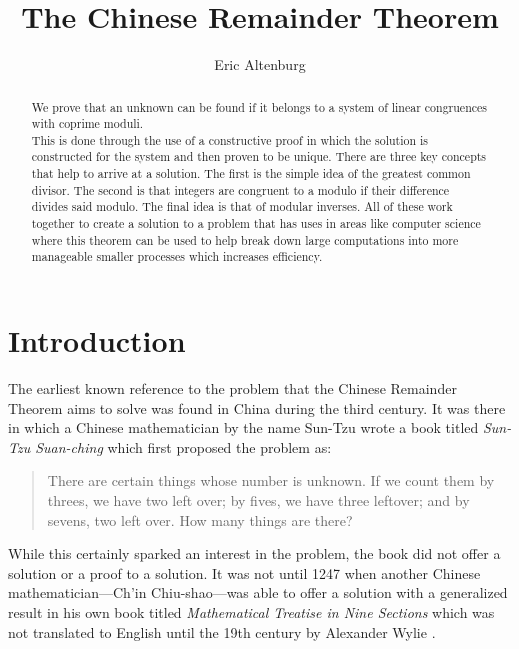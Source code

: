 \documentclass[12pt,a4paper,reqno,parskip=full]{amsart}
\numberwithin{equation}{section}
\theoremstyle{plain}
\theoremstyle{definition}
\begin{document}
\title{The Chinese Remainder Theorem}

\author{Eric Altenburg}

\begin{abstract}
We prove that an unknown can be found if it belongs to a system of linear congruences with coprime moduli.\\

This is done through the use of a constructive proof in which the solution is constructed for the system and then proven to be unique. There are three key concepts that help to arrive at a solution. The first is the simple idea of the greatest common divisor. The second is that integers are congruent to a modulo if their difference divides said modulo. The final idea is that of modular inverses. All of these work together to create a solution to a problem that has uses in areas like computer science where this theorem can be used to help break down large computations into more manageable smaller processes which increases efficiency.
\end{abstract}

\maketitle



\section{Introduction}

The earliest known reference to the problem that the Chinese Remainder Theorem aims to solve was found in China during the third century. It was there in which a Chinese mathematician by the name Sun-Tzu wrote a book titled \textit{Sun-Tzu Suan-ching} which first proposed the problem as:

\begin{quote}
	There are certain things whose number is unknown. If we count them by threes, we have two left over; by fives, we have three leftover; and by sevens, two left over. How many things are there? \cite{elements-of-the-theory-of-number}
\end{quote}

While this certainly sparked an interest in the problem, the book did not offer a solution or a proof to a solution. It was not until 1247 when another Chinese mathematician—Ch'in Chiu-shao—was able to offer a solution with a generalized result in his own book titled \textit{Mathematical Treatise in Nine Sections} which was not translated to English until the 19th century by Alexander Wylie \cite{katz}. 
\end{document}
